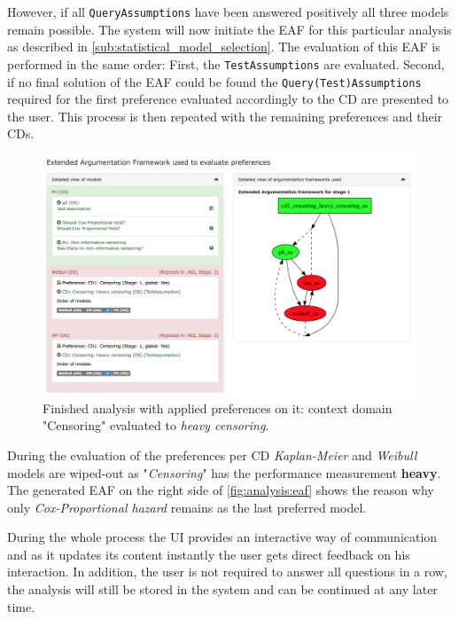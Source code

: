 However, if all \texttt{QueryAssumptions} have been answered positively all three models remain possible. The system will now initiate the \gls{EAF} for this particular analysis as described in \autoref{sub:statistical_model_selection}. The evaluation of this \gls{EAF} is performed in the same order: First, the \texttt{TestAssumptions} are evaluated. Second, if no final solution of the \gls{EAF} could be found the \texttt{Query(Test)Assumptions} required for the first preference evaluated accordingly to the \gls{CD} are presented to the user. This process is then repeated with the remaining preferences and their \glspl{CD}.

\begin{figure}[t]
	\centering
	\includegraphics[width=\textwidth]{figures/ui_analysis_eaf}
	\caption{Finished analysis with applied preferences on it: context domain "Censoring" evaluated to \textit{heavy censoring}. }
	\label{fig:analysis:eaf}
\end{figure}


During the evaluation of the preferences per \gls{CD} \textit{Kaplan-Meier} and \textit{Weibull} models are wiped-out as "\textit{Censoring}" has the performance measurement \textbf{heavy}. The generated \gls{EAF} on the right side of \autoref{fig:analysis:eaf} shows the reason why only \textit{Cox-Proportional hazard} remains as the last preferred model.


During the whole process the \gls{UI} provides an interactive way of communication and as it updates its content instantly the user gets direct feedback on his interaction. In addition, the user is not required to answer all questions in a row, the analysis will still be stored in the system and can be continued at any later time. 